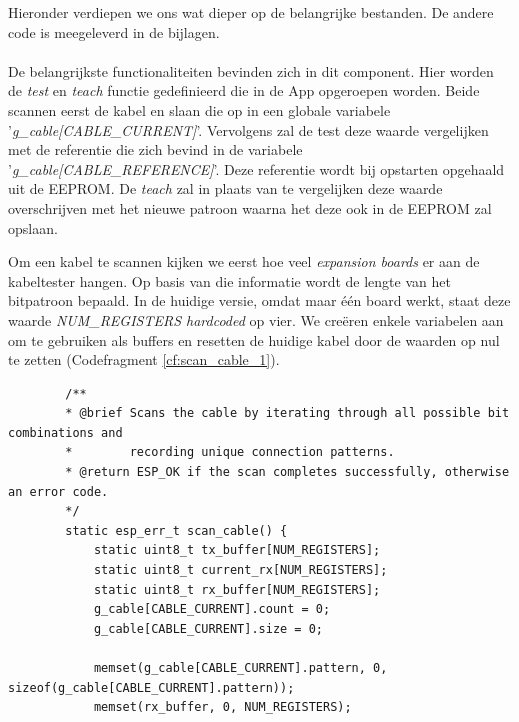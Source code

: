 Hieronder verdiepen we ons wat dieper op de belangrijke bestanden. De andere code is meegeleverd in de bijlagen. 

\paragraph{}%

De belangrijkste functionaliteiten bevinden zich in dit component. Hier worden de \textit{test} en \textit{teach} functie gedefinieerd die in de App opgeroepen worden. Beide scannen eerst de kabel en slaan die op in een globale variabele '\textit{g\_cable[CABLE\_CURRENT]}'. Vervolgens zal de test deze waarde vergelijken met de referentie die zich bevind in de variabele '\textit{g\_cable[CABLE\_REFERENCE]}'. Deze referentie wordt bij opstarten opgehaald uit de \gls{EEPROM}. De \textit{teach} zal in plaats van te vergelijken deze waarde overschrijven met het nieuwe patroon waarna het deze ook in de \gls{EEPROM} zal opslaan.

Om een kabel te scannen kijken we eerst hoe veel \textit{expansion boards} er aan de kabeltester hangen. Op basis van die informatie wordt de lengte van het bitpatroon bepaald. In de huidige versie, omdat maar één board werkt, staat deze waarde \textit{NUM\_REGISTERS hardcoded} op vier. We creëren enkele variabelen aan om te gebruiken als buffers en resetten de huidige kabel door de waarden op nul te zetten (Codefragment \ref{cf:scan_cable_1}).

\begin{listing}[H]
    \begin{verbatim}
        /**
        * @brief Scans the cable by iterating through all possible bit combinations and
        *        recording unique connection patterns.
        * @return ESP_OK if the scan completes successfully, otherwise an error code.
        */
        static esp_err_t scan_cable() {
            static uint8_t tx_buffer[NUM_REGISTERS];
            static uint8_t current_rx[NUM_REGISTERS];
            static uint8_t rx_buffer[NUM_REGISTERS];
            g_cable[CABLE_CURRENT].count = 0;
            g_cable[CABLE_CURRENT].size = 0;
            
            memset(g_cable[CABLE_CURRENT].pattern, 0, sizeof(g_cable[CABLE_CURRENT].pattern));
            memset(rx_buffer, 0, NUM_REGISTERS);
    \end{verbatim}
    \caption[scan\_cable pt 1]{Het initialiseren van buffers}
    \label{cf:scan_cable_1}
\end{listing}

